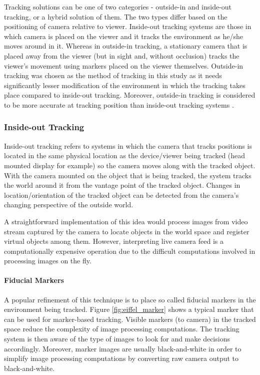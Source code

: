 Tracking solutions can be one of two categories - outside-in and inside-out tracking, or a hybrid solution of them.  The two types differ based on the positioning of camera relative to viewer. Inside-out tracking systems are those in which camera is placed on the viewer and it tracks the environment as he/she moves around in it. Whereas in outside-in tracking, a stationary camera that is placed away from the viewer (but in sight and, without occlusion) tracks the viewer’s movement using markers placed on the viewer themselves. Outside-in tracking was chosen as the method of tracking in this study as it needs significantly lesser modification of the environment in which the tracking takes place compared to inside-out tracking. Moreover, outside-in tracking is considered to be more accurate at tracking position than inside-out tracking systems \parencite{klein2006visual}. 

\subsubsection{Inside-out Tracking}
Inside-out tracking refers to systems in which the camera that tracks positions is located in the same physical location as the device/viewer being tracked (head mounted display for example) so the camera moves along with the tracked object. With the camera mounted on the object that is being tracked, the system tracks the world around it from the vantage point of the tracked object. Changes in location/orientation of the tracked object can be detected from the camera’s changing perspective of the outside world.

A straightforward implementation of this idea would process images from video stream captured by the camera to locate objects in the world space and register virtual objects among them. However, interpreting live camera feed is a computationally expensive operation due to the difficult computations involved in processing images on the fly. 

\paragraph{Fiducial Markers}
A popular refinement of this technique is to place so called fiducial markers in the environment being tracked. Figure \ref{fig:eiffel_marker} shows a typical marker that can be used for marker-based tracking. Visible markers (to camera) in the tracked space reduce the complexity of image processing computations. The tracking system is then aware of the type of images to look for and make decisions accordingly. Moreover, marker images are usually black-and-white in order to simplify image processing computations by converting raw camera output to black-and-white. 

